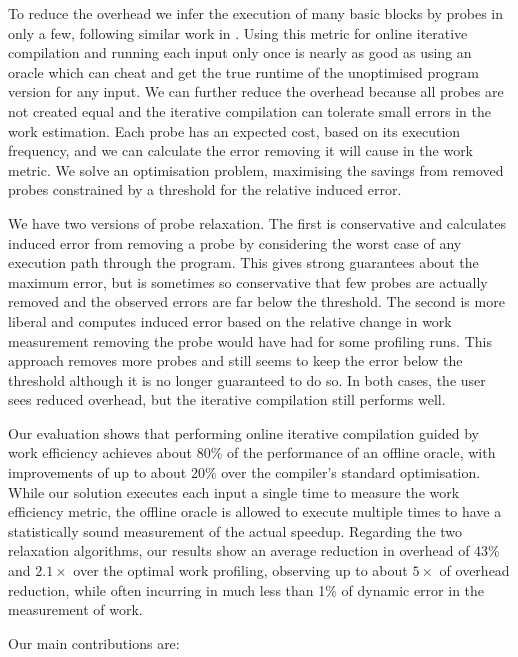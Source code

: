     To reduce the overhead we infer the execution of many basic blocks by probes in only a few, following similar work in \cite{??}. 
    Using this metric for online iterative compilation and running each input only once is nearly as good as using an oracle which can cheat and get the true runtime of the unoptimised program version for any input.
    We can further reduce the overhead because all probes are not created equal and the iterative compilation can tolerate small errors in the work estimation.
    Each probe has an expected cost, based on its execution frequency, and we can calculate the error removing it will cause in the work metric.
    We solve an optimisation problem, maximising the savings from removed probes constrained by a threshold for the relative induced error. 

    We have two versions of probe relaxation.
    The first is conservative and calculates induced error from removing a probe by considering the worst case of any execution path through the program.
    This gives strong guarantees about the maximum error, but is sometimes so conservative that few probes are actually removed and the observed errors are far below the threshold.
    The second is more liberal and computes induced error based on the relative change in work measurement removing the probe would have had for some profiling runs.
    This approach removes more probes and still seems to keep the error below the threshold although it is no longer guaranteed to do so.
    In both cases, the user sees reduced overhead, but the iterative compilation still performs well.
    
    Our evaluation shows that performing online iterative compilation guided by work efficiency achieves about 80\% of the performance of an offline oracle, with improvements of up to about 20\% over the compiler's standard optimisation. While our solution executes each input a single time to measure the work efficiency metric, the offline oracle is allowed to execute multiple times to have a statistically sound measurement of the actual speedup. Regarding the two relaxation algorithms, our results show an average reduction in overhead of 43\% and $2.1\times$ over the optimal work profiling, observing up to about $5\times$ of overhead reduction, while often incurring in much less than 1\% of dynamic error in the measurement of work.
    
    Our main contributions are:

